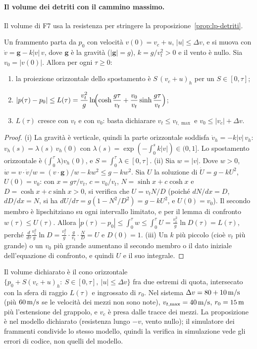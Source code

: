 \paragraph{Il volume dei detriti con il cammino massimo.} Il volume di F7 usa la resistenza per stringere la proposizione~\ref{prop:lp-detriti}.

\begin{proposizione}\label{prop:vo-cammino}
Un frammento parta da $p_0$ con velocità $v(0)=v_c+u$, $|u|\le\Delta v$, e si muova con $\dot v=\mathbf g-k|v|\,v$, dove $\mathbf g$ è la gravità ($|\mathbf g|=g$), $k=g/v_t^2>0$ e il vento è nullo. Sia $v_0=|v(0)|$. Allora per ogni $\tau\ge0$:
\begin{enumerate}[label=(\roman*)]
\item la proiezione orizzontale dello spostamento è $S\,(v_c+u)_h$ per un $S\in[0,\tau]$;
\item $|p(\tau)-p_0|\le L(\tau)=\dfrac{v_t^2}{g}\ln\!\Bigl(\cosh\dfrac{g\tau}{v_t}+\dfrac{v_0}{v_t}\sinh\dfrac{g\tau}{v_t}\Bigr)$;
\item $L(\tau)$ cresce con $v_t$ e con $v_0$: basta dichiarare $v_t\le v_{t,\max}$ e $v_0\le|v_c|+\Delta v$.
\end{enumerate}
\end{proposizione}
\begin{proof}
(i) La gravità è verticale, quindi la parte orizzontale soddisfa $\dot v_h=-k|v|\,v_h$: $v_h(s)=\lambda(s)\,v_h(0)$ con $\lambda(s)=\exp(-\int_0^sk|v|)\in(0,1]$. Lo spostamento orizzontale è $\bigl(\int_0^\tau\lambda\bigr)v_h(0)$, e $S=\int_0^\tau\lambda\in[0,\tau]$.
(ii) Sia $w=|v|$. Dove $w>0$, $\dot w=v\cdot\dot v/w=(v\cdot\mathbf g)/w-kw^2\le g-kw^2$. Sia $U$ la soluzione di $\dot U=g-kU^2$, $U(0)=v_0$: con $x=g\tau/v_t$, $c=v_0/v_t$, $N=\sinh x+c\cosh x$ e $D=\cosh x+c\sinh x>0$, si verifica che $U=v_tN/D$ (poiché $dN/dx=D$, $dD/dx=N$, si ha $dU/d\tau=g(1-N^2/D^2)=g-kU^2$, e $U(0)=v_0$). Il secondo membro è lipschitziano su ogni intervallo limitato, e per il lemma di confronto $w(\tau)\le U(\tau)$. Allora $|p(\tau)-p_0|\le\int_0^\tau w\le\int_0^\tau U=\frac{v_t^2}{g}\ln D(\tau)=L(\tau)$, perché $\frac{d}{d\tau}\frac{v_t^2}{g}\ln D=\frac{v_t^2}{g}\cdot\frac{g}{v_t}\cdot\frac ND=U$ e $D(0)=1$.
(iii) Un $k$ più piccolo (cioè $v_t$ più grande) o un $v_0$ più grande aumentano il secondo membro o il dato iniziale dell'equazione di confronto, e quindi $U$ e il suo integrale.
\end{proof}
Il volume dichiarato è il cono orizzontale $\{p_0+S(v_c+u)_h:\ S\in[0,\tau],\ |u|\le\Delta v\}$ fra due estremi di quota, intersecato con la sfera di raggio $L(\tau)$ e ingrossato di $r_0$. Nel sistema $\Delta v=80+10\,\mathrm{m/s}$ (più $60\,\mathrm{m/s}$ se le velocità dei mezzi non sono note), $v_{t,\max}=40\,\mathrm{m/s}$, $r_0=15\,\mathrm{m}$ più l'estensione del grappolo, e $v_c$ è presa dalle tracce dei mezzi. La proposizione è  nel modello dichiarato (resistenza lungo $-v$, vento nullo); il simulatore dei frammenti condivide lo stesso modello, quindi la verifica in simulazione vede gli errori di codice, non quelli del modello.

